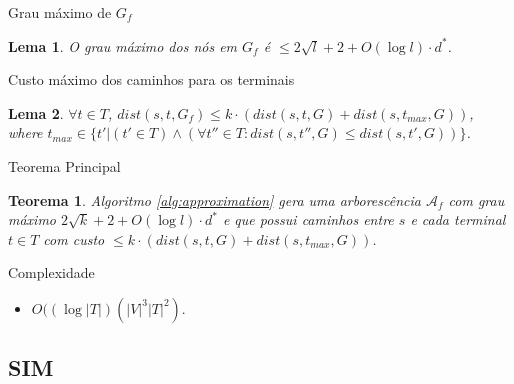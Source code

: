 \documentclass[10pt]{beamer}
\newtheorem{lema}{Lema}
\newtheorem{teorema}[theorem]{Teorema}
\begin{document}
\begin{frame}{Grau máximo de $G_f$}
  \begin{lema}
    \label{lem:max_degree}
    O grau máximo dos nós em $G_f$ é $\leq 2\sqrt{l} + 2 + O(\log l) \cdot d^*$.
  \end{lema}
\hypertarget{max_degree}{}
\hyperlink{max_degree_slide}{}
\end{frame}

\begin{frame}{Custo máximo dos caminhos para os terminais}
  \begin{lema}
    \label{lem:cost_guaranteed}
$\forall t \in T$, $dist(s,t,G_f) \leq k \cdot ( dist(s,t,G) + dist(s,t_{max},G))$, 
where $t_{max} \in \{t' | 
(t' \in T) \land (\forall t'' \in T : dist(s,t'',G) \le dist(s,t',G))\}$.
  \end{lema}
\hypertarget{cost_guaranteed}{}
\hyperlink{cost_guaranteed_slide}{}
\end{frame}

\begin{frame}{Teorema Principal}
  \begin{teorema}
    \label{teorema:final_theorem}
    Algoritmo \ref{alg:approximation} gera uma arborescência $\mathcal{A}_f$ com grau máximo $2\sqrt{k} + 2 + O(\log l) \cdot d^*$ e que possui caminhos entre $s$ e 
cada terminal $t \in T$ com custo $\le k \cdot ( dist(s,t,G) + dist(s,t_{max},G))$.
  \end{teorema}
\hypertarget{final_theorem}{}
\hyperlink{final_theorem_slide}{}
\end{frame}

\begin{frame}{Complexidade}
\label{comp:comp_approx}
\begin{itemize}
  \item $O((\log{|T|})(|V|^3|T|^2)$.
\end{itemize}
\hypertarget{comp_approx}{}
\hyperlink{comp_approx_slide}{}
\end{frame}

\subsection{SIM}
\end{document}
